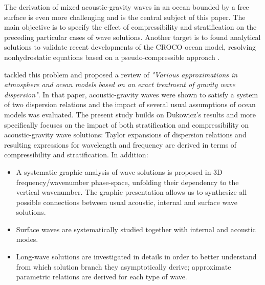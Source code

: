 \documentclass[a4paper,11pt]{article}
\begin{document}
The derivation of mixed acoustic-gravity waves in an ocean bounded by a free surface is even more challenging and is the central subject of this paper. The main objective is to specify the effect of compressibility and stratification on the preceding particular cases of wave solutions. Another target is to found analytical solutions to validate recent developments of the CROCO ocean model, resolving nonhydrostatic equations based on a pseudo-compressible approach \citep{AUCLAIR201812}.

\cite{dukowicz_2013} tackled this problem and proposed a review of \textit{"Various approximations in atmosphere and ocean models based on an exact treatment of gravity wave dispersion"}. In that paper, acoustic-gravity waves were shown to satisfy a system of two dispersion relations and the impact of several usual assumptions of ocean models was evaluated. The present study builds on Dukowicz's results and more specifically focuses on the impact of both stratification and compressibility on acoustic-gravity wave solutions: Taylor expansions of dispersion relations and resulting expressions for wavelength and frequency are derived in terms of compressibility and stratification. In addition:
\begin{itemize}
	\item A systematic graphic analysis of wave solutions is proposed in 3D frequency/wavenumber phase-space, unfolding their dependency to the vertical wavenumber. The graphic presentation allows us to synthesize all possible connections between usual acoustic, internal and surface wave solutions.
	\item Surface waves are systematically studied together with internal and acoustic modes.
	\item Long-wave solutions are investigated in details in order to better understand from which solution branch they asymptotically derive; approximate parametric relations are derived for each type of wave.
\end{itemize}
\end{document}

